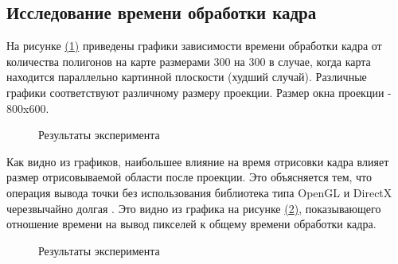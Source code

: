\documentclass{article}
\begin{document}
	\subsection{Исследование времени обработки кадра}
	\indent На рисунке \hyperref[polygonTest]{(\ref{polygonTest})} приведены графики зависимости времени обработки кадра от количества полигонов на карте размерами 300 на 300 в случае, когда карта находится параллельно картинной плоскости (худший случай). Различные графики соответствуют различному размеру проекции. Размер окна проекции - 800x600.
	\begin{figure}[H]
		 \caption{Результаты эксперимента}
		 \label{polygonTest}
	 \end{figure}
	Как видно из графиков, наибольшее влияние на время отрисовки кадра влияет размер отрисовываемой области после проекции. Это объясняется тем, что операция вывода точки без использования библиотека типа OpenGL и DirectX черезвычайно долгая \cite{opengl}\cite{directx}. Это видно из графика на рисунке \hyperref[drawTest]{(\ref{drawTest})}, показывающего отношение времени на вывод пикселей к общему времени обработки кадра.
\begin{figure}[H]
		 \caption{Результаты эксперимента}
		 \label{drawTest}
	 \end{figure}
\end{document}
